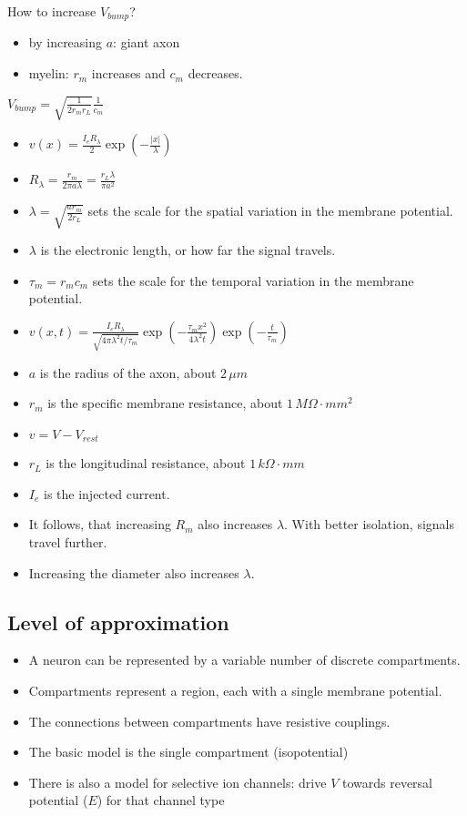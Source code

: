 \documentclass[main]{subfiles}
\begin{document}
How to increase $V_{bump}$?
\begin{itemize}
\item by increasing $a$: giant axon
\item myelin: $r_m$ increases and $c_m$ decreases.
\end{itemize}

$V_{bump} = \sqrt{\frac{1}{2 r_m r_L}} \frac{1}{c_m}$

\begin{itemize}[noitemsep,nolistsep]
	\item $v(x) = \frac{I_eR_\lambda}{2}\exp(-\frac{|x|}{\lambda})$
	\item $R_\lambda=\frac{r_m}{2\pi a\lambda} = \frac{r_L\lambda}{\pi a^2}$
	\item $\lambda = \sqrt{\frac{ar_m}{2r_L}}$ sets the scale for the spatial variation in the membrane potential.
	\item $\lambda$ is the electronic length, or how far the signal travels.
	\item $\tau_m = r_mc_m$ sets the scale for the temporal variation in the membrane potential.
	\item $v(x,t) = \frac{I_eR_\lambda}{\sqrt{4\pi\lambda^2t/\tau_m}}\exp(-\frac{\tau_mx^2}{4\lambda^2t})\exp(-\frac{t}{\tau_m})$
	\item $a$ is the radius of the axon, about $2\,\mu m$
	\item $r_m$ is the specific membrane resistance, about $1\,M\Omega\cdot mm^2$
	\item $v = V - V_{rest}$
	\item $r_L$ is the longitudinal resistance, about $1\,k\Omega\cdot mm$
	\item $I_e$ is the injected current.
	\item It follows, that increasing $R_m$ also increases $\lambda$. With better isolation, signals travel further.
	\item Increasing the diameter also increases $\lambda$.
\end{itemize}

\subsection{Level of approximation}
\begin{itemize}[noitemsep,nolistsep]
	\item A neuron can be represented by a variable number of discrete compartments.
	\item Compartments represent a region, each with a single membrane potential.
	\item The connections between compartments have resistive couplings.
	\item The basic model is the single compartment (isopotential)
	\item There is also a model for selective ion channels: drive $V$ towards reversal potential ($E$) for that channel type
\end{itemize}
\end{document}
